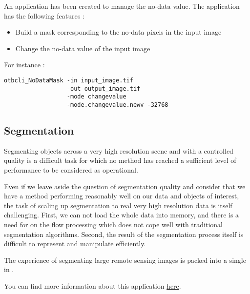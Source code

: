 An application has been created to manage the no-data value. The
 application has the following features :
\begin{itemize}
\item Build a mask corresponding to the no-data pixels in the input image
\item Change the no-data value of the input image
\end{itemize}

For instance :
\begin{verbatim}
otbcli_NoDataMask -in input_image.tif
                  -out output_image.tif
                  -mode changevalue
                  -mode.changevalue.newv -32768
\end{verbatim}

\subsection{Segmentation}\label{ssec:segmentation}

Segmenting objects across a very high resolution scene and with a controlled
quality is a difficult task for which no method has reached a sufficient level
of performance to be considered as operational.

Even if we leave aside the question of segmentation quality and
consider that we have a method performing reasonably well on our data
and objects of interest, the task of scaling up segmentation to real
very high resolution data is itself challenging. First, we can not
load the whole data into memory, and there is a need for on the flow
processing which does not cope well with traditional segmentation
algorithms. Second, the result of the segmentation process
itself is difficult to represent and manipulate efficiently.

The experience of segmenting large remote sensing images is packed into a single
 in \app.

You can find more information about this application
\href{http://blog.orfeo-toolbox.org/preview/coming-next-large-scale-segmentation}{here}.




